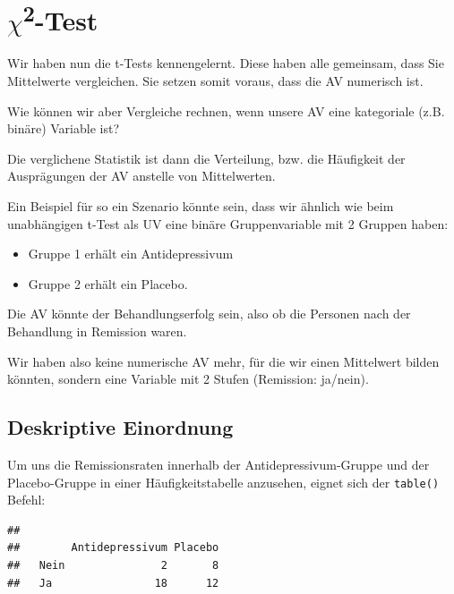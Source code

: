 \documentclass[
]{book}
\newenvironment{Shaded}{\begin{snugshade}}{\end{snugshade}}
\newcommand{\FunctionTok}[1]{\textcolor[rgb]{0.13,0.29,0.53}{\textbf{#1}}}
\newcommand{\NormalTok}[1]{#1}
\newcommand{\SpecialCharTok}[1]{\textcolor[rgb]{0.81,0.36,0.00}{\textbf{#1}}}
\providecommand{\tightlist}{%
  \setlength{\itemsep}{0pt}\setlength{\parskip}{0pt}}
\begin{document}
\section{\texorpdfstring{\(\chi\)\textsuperscript{2}-Test}{\textbackslash chi2-Test}}\label{chi2-test}

Wir haben nun die t-Tests kennengelernt. Diese haben alle gemeinsam, dass Sie Mittelwerte vergleichen. Sie setzen somit voraus, dass die AV numerisch ist.

Wie können wir aber Vergleiche rechnen, wenn unsere AV eine kategoriale (z.B. binäre) Variable ist?

Die verglichene Statistik ist dann die Verteilung, bzw. die Häufigkeit der Ausprägungen der AV anstelle von Mittelwerten.

Ein Beispiel für so ein Szenario könnte sein, dass wir ähnlich wie beim unabhängigen t-Test als UV eine binäre Gruppenvariable mit 2 Gruppen haben:

\begin{itemize}
\tightlist
\item
  Gruppe 1 erhält ein Antidepressivum
\item
  Gruppe 2 erhält ein Placebo.
\end{itemize}

Die AV könnte der Behandlungserfolg sein, also ob die Personen nach der Behandlung in Remission waren.

Wir haben also keine numerische AV mehr, für die wir einen Mittelwert bilden könnten, sondern eine Variable mit 2 Stufen (Remission: ja/nein).

\subsection{Deskriptive Einordnung}\label{deskriptive-einordnung-3}

Um uns die Remissionsraten innerhalb der Antidepressivum-Gruppe und der Placebo-Gruppe in einer Häufigkeitstabelle anzusehen, eignet sich der \texttt{table()} Befehl:

\begin{Shaded}
\end{Shaded}

\begin{verbatim}
##       
##        Antidepressivum Placebo
##   Nein               2       8
##   Ja                18      12
\end{verbatim}
\end{document}
